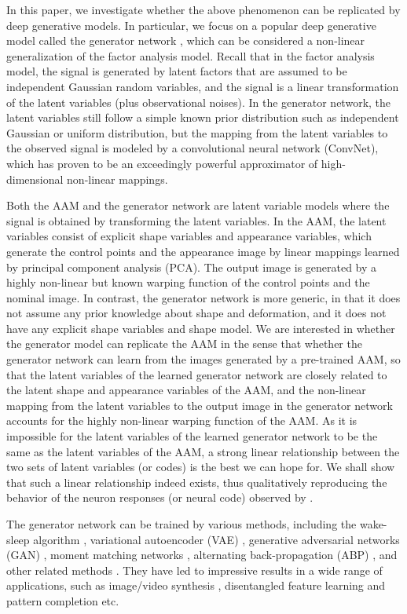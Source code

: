 \documentclass{article}
\begin{document}
In this paper, we investigate whether the above phenomenon can be replicated by deep generative models. In particular, we focus on a popular deep generative model called the  {generator network} \cite{goodfellow2014generative}, which can be considered a non-linear generalization of the factor analysis model. Recall that in the factor analysis model, the signal is generated by latent factors  that are assumed to be independent Gaussian random variables, and the signal is a linear transformation of the latent variables (plus observational noises). In the generator network, the latent variables still follow a simple known prior distribution such as independent Gaussian or uniform distribution, but the mapping from the latent variables to the observed signal is modeled by a convolutional neural network (ConvNet), which has proven to be an exceedingly powerful approximator of high-dimensional non-linear mappings.

Both the AAM and the generator network are latent variable models where the signal is obtained by transforming the latent variables. In the AAM, the latent variables consist of explicit shape variables and appearance variables, which generate the control points and the appearance image by linear mappings learned by principal component analysis (PCA). The output image is generated by a highly non-linear but known warping function of the control points and the nominal image. In contrast, the generator network is more generic, in that it does not assume any prior knowledge about shape and deformation, and it does not have any explicit shape variables and shape model. We are interested in whether the generator model can replicate the AAM in the sense that whether the generator network can learn from the images generated by a pre-trained AAM, so that the latent variables of the learned generator network are closely related to the latent shape and appearance variables of the AAM, and the non-linear mapping from the latent variables to the output image in the generator network accounts for the highly non-linear warping function of the AAM. As it is impossible for the latent variables of the learned generator network to be the same as the latent variables of the AAM, a strong linear relationship between the two sets of latent variables (or codes) is the best we can hope for. We shall show that such a linear relationship indeed exists, thus qualitatively reproducing the behavior of the neuron responses (or neural code) observed by \cite{chang2017code}.

The generator network can be trained by various methods, including the wake-sleep algorithm \cite{hinton1995wake}, variational autoencoder (VAE) \cite{KingmaCoRR13,RezendeICML2014,salimans2015markov}, generative adversarial networks (GAN) \cite{goodfellow2014generative,radford2015unsupervised,denton2015deep}, moment matching networks \cite{li2015generative}, alternating back-propagation (ABP) \cite{Han2017}, and other related methods \cite{oord2016pixel,Dinh2016DensityEU}. They have led to impressive results in a wide range of applications, such as image/video synthesis \cite{Alexey2015}, disentangled feature learning \cite{chen2016infogan,higgins2016beta} and pattern completion \cite{Han2017} etc.
\end{document}
